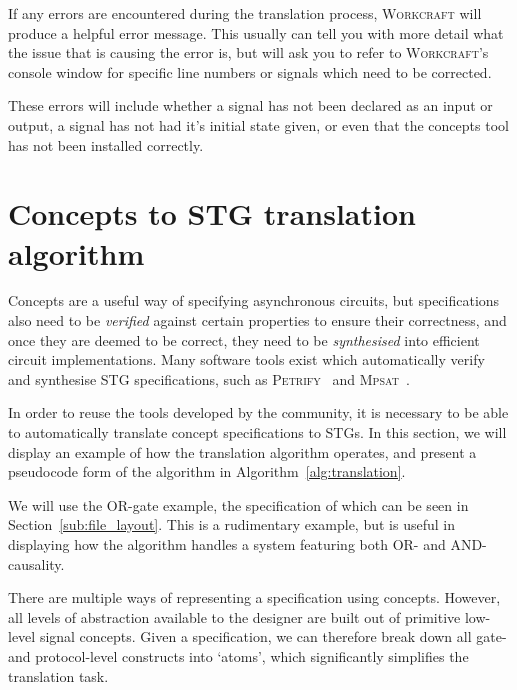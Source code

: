 \documentclass[british,conference,compsoc]{IEEEtran}
\newcommand{\noun}[1]{\textsc{#1}}
\begin{document}
If any errors are encountered during the translation process, \noun{Workcraft} 
will produce a helpful error message. This usually can tell you with more 
detail what the issue that is causing the error is, but will ask you to refer 
to \noun{Workcraft}'s console window for specific line numbers or signals which
need to be corrected. 

These errors will include whether a signal has not been declared as an input or
output, a signal has not had it's initial state given, or even that the 
concepts tool has not been installed correctly. 

\vspace{-3mm}

\section{Concepts to STG translation algorithm\label{sec:algorithm}}

\vspace{-2mm}

Concepts are a useful way of specifying asynchronous circuits, but
specifications also need to be \emph{verified} against certain properties to
ensure their correctness, and once they are deemed to be correct, they need to
be \emph{synthesised} into efficient circuit implementations. Many software
tools exist which automatically verify and synthesise STG specifications,
such as \noun{Petrify}~\cite{Cortadella} and
\noun{Mpsat}~\cite{khomenko2004detecting}.

In order to reuse the tools developed by the community, it is
necessary to be able to automatically translate concept specifications to STGs.
In this section, we will display an example of how the translation algorithm 
operates, and present a pseudocode form of the algorithm in 
Algorithm~\ref{alg:translation}. 

We will use the OR-gate example, the specification of which can be seen in 
Section~\ref{sub:file_layout}. This is a rudimentary example, but is useful in 
displaying how the algorithm handles a system featuring both OR- and 
AND-causality.

There are multiple ways of representing a specification using concepts. However,
all levels of abstraction available to the designer are built out of primitive 
low-level signal concepts. Given a specification, we can therefore break down 
all gate- and protocol-level constructs into `atoms', which significantly 
simplifies the translation task.
\end{document}
